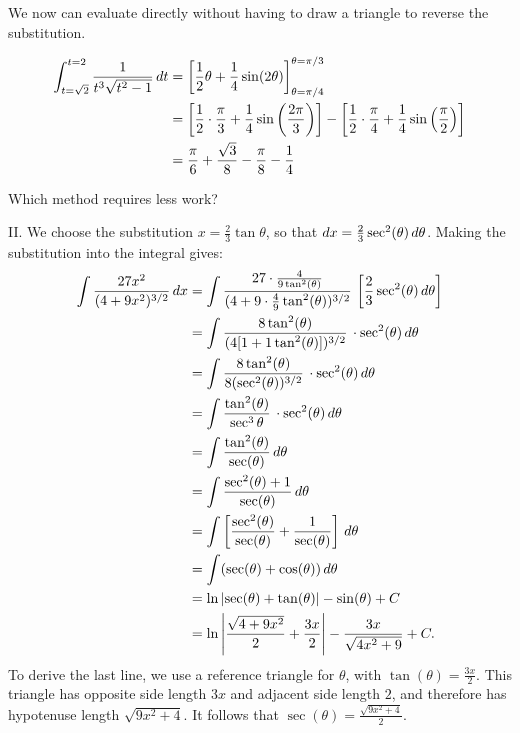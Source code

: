 \documentclass[noauthor]{ximera}
\begin{document}
\begin{freeResponse}
We now can evaluate directly without having to draw a triangle to reverse the substitution.

\begin{align*}
\int_{t=\sqrt{2}}^{t=2} \frac{1}{t^3\sqrt{t^2-1}} \mathop{}\!d t &= \bigg[ \frac{1}{2}\theta + \frac{1}{4} \sin (2\theta) \bigg]_{\theta=\pi/4}^{\theta= \pi/3} \\
&= \left[\frac{1}{2}\cdot \frac{\pi}{3} + \frac{1}{4} \sin \left(\frac{2\pi}{3}\right) \right] - \left[\frac{1}{2}\cdot \frac{\pi}{4} + \frac{1}{4} \sin \left(\frac{\pi}{2}\right) \right] \\
&= \frac{\pi}{6} +\frac{\sqrt{3}}{8} - \frac{\pi}{8} -\frac{1}{4}
\end{align*}

Which method requires less work?

II. We choose the substitution $ x = \frac{2}{3} \tan\theta$, so that $\mathop{}\!d x = \frac{2}{3} \sec^2(\theta) \mathop{}\!d \theta$. Making the substitution into the integral gives:
\begin{align*}
\int \frac{27 x^2}{(4+9x^2)^{3/2}} \, dx & =  \int \dfrac{27 \cdot  \frac{4}{9 \tan^2(\theta)}}{(4+9 \cdot \frac{4}{9}\tan^2(\theta))^{3/2}} \, \left[ \dfrac{2}{3} \sec^2(\theta) \mathop{}\!d \theta \right] \\ 
&=  \int \dfrac{8 \tan^2(\theta)}{ (4[1+1\tan^2(\theta)])^{3/2}} \,  \cdot \sec^2(\theta) \mathop{}\!d \theta  \\
&=  \int \dfrac{8 \tan^2(\theta)}{8 (\sec^2(\theta))^{3/2}} \,  \cdot \sec^2(\theta) \mathop{}\!d \theta  \\
&=  \int \dfrac{   \tan^2(\theta)}{\sec^3 \theta} \,  \cdot \sec^2(\theta) \mathop{}\!d \theta  \\
&=  \int \dfrac{   \tan^2(\theta)}{\sec(\theta)} \mathop{}\!d \theta \\
&=  \int \dfrac{   \sec^2(\theta) + 1}{\sec(\theta)} \,  d\theta  \\
&=  \int \left[\dfrac{   \sec^2(\theta)}{\sec(\theta)} + \dfrac{1}{\sec(\theta)}\right] \,  d\theta  \\
&=  \int ( \sec(\theta) + \cos(\theta) )  \,  d\theta  \\
&=  \ln \left| \sec(\theta) + \tan(\theta) \right| - \sin(\theta) +C  \\
&= \ln \left| \dfrac{\sqrt{4+9x^2}}{2}+\dfrac{3x}{2} \right| - \dfrac{3x}{\sqrt{4x^2+9}} +C.
\end{align*}
To derive the last line, we use a reference triangle for $\theta$, with $\tan(\theta) = \frac{3x}{2}$. This triangle has opposite side length $3x$ and adjacent side length $2$, and therefore has hypotenuse length $\sqrt{9x^2 + 4}$. It follows that $\sec(\theta) = \frac{\sqrt{9x^2+4}}{2}$.


\end{freeResponse}
\end{document}
